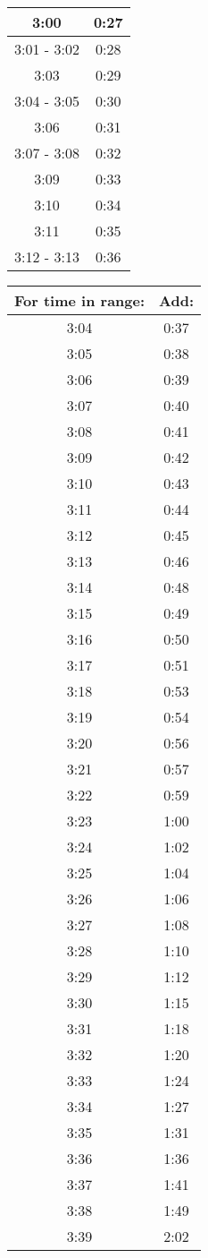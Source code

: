 \begin{minipage}{0.5\textwidth}
\begin{tabular}[t]{c|c}
	3:00  & 0:27 \\\hline
	3:01 - 3:02 & 0:28 \\\hline
	3:03 & 0:29 \\\hline
	3:04 - 3:05 & 0:30 \\\hline
	3:06 & 0:31 \\\hline
	3:07 - 3:08 & 0:32 \\\hline
	3:09 & 0:33 \\\hline
	3:10 & 0:34 \\\hline
	3:11 & 0:35 \\\hline
	3:12 - 3:13 & 0:36 \\\hline
	\end{tabular}\end{minipage}
		\begin{minipage}{0.5\textwidth}\begin{tabular}[t]{c|c}
	For time in range: & Add: \\\hline
	3:04 & 0:37 \\\hline
					3:05 & 0:38 \\\hline
						3:06 & 0:39 \\\hline
					3:07 & 0:40 \\\hline
					3:08 & 0:41 \\\hline
					3:09 & 0:42 \\\hline
	3:10 & 0:43 \\\hline
	3:11 & 0:44 \\\hline
	3:12 & 0:45 \\\hline
	3:13 & 0:46 \\\hline
	3:14 & 0:48 \\\hline
	3:15 & 0:49 \\\hline
	3:16 & 0:50 \\\hline
	3:17 & 0:51 \\\hline
	3:18 & 0:53 \\\hline
	3:19 & 0:54 \\\hline
	3:20 & 0:56 \\\hline
	3:21 & 0:57 \\\hline
	3:22 & 0:59 \\\hline
	3:23 & 1:00 \\\hline
	3:24 & 1:02 \\\hline
	3:25 & 1:04 \\\hline
	3:26 & 1:06 \\\hline
	3:27 & 1:08 \\\hline
	3:28 & 1:10 \\\hline
	3:29 & 1:12 \\\hline
	3:30 & 1:15 \\\hline
	3:31 & 1:18 \\\hline
	3:32 & 1:20 \\\hline
	3:33 & 1:24 \\\hline
	3:34 & 1:27 \\\hline
	3:35 & 1:31 \\\hline
	3:36 & 1:36 \\\hline
	3:37 & 1:41 \\\hline
	3:38 & 1:49 \\\hline
	3:39 & 2:02
\end{tabular}\end{minipage}\newpage

